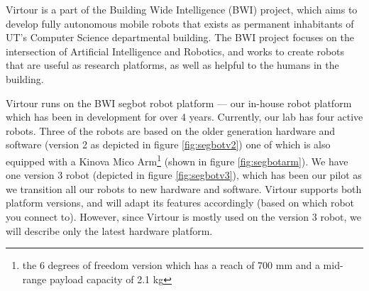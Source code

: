 \documentclass[
  oneside,
  11pt, a4paper,
  footinclude=true,
  headinclude=true,
  cleardoublepage=empty
]{article}
\begin{document}
Virtour is a part of the Building Wide Intelligence (BWI) project, which aims
to develop fully autonomous mobile robots that exists as permanent inhabitants
of UT's Computer Science departmental building. The BWI project focuses on the
intersection of Artificial Intelligence and Robotics, and works to create
robots that are useful as research platforms, as well as helpful to the humans
in the building.

Virtour runs on the BWI segbot robot platform --- our in-house robot
platform which has been in development for over 4 years. Currently, our lab has
four active robots. Three of the robots are based on the older generation
hardware and software (version 2 as depicted in figure \ref{fig:segbotv2}) one
of which is also equipped with a Kinova Mico Arm\footnote{the 6 degrees of
freedom version which has a reach of 700 mm and a mid-range payload capacity of
2.1 kg} (shown in figure \ref{fig:segbotarm}).  We have one version 3 robot
(depicted in figure \ref{fig:segbotv3}), which has been our pilot as we
transition all our robots to new hardware and software.  Virtour supports both
platform versions, and will adapt its features accordingly (based on which
robot you connect to). However, since Virtour is mostly used on the version 3
robot, we will describe only the latest hardware platform.
\end{document}
